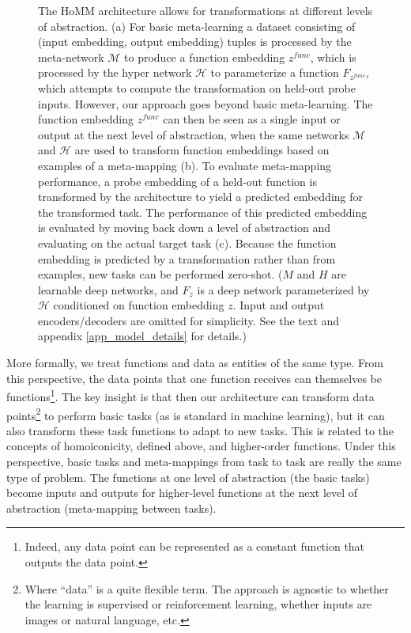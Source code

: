 \documentclass{article}
\begin{document}
\begin{figure}[t]
\caption{The HoMM architecture allows for transformations at different levels of abstraction. (a) For basic meta-learning a dataset consisting of (input embedding, output embedding) tuples is processed by the meta-network \(\mathcal{M}\) to produce a function embedding \(z^{func}\), which is processed by the hyper network \(\mathcal{H}\) to parameterize a function \(F_{z^{func}}\), which attempts to compute the transformation on held-out probe inputs. However, our approach goes beyond basic meta-learning. The function embedding \(z^{func}\) can then be seen as a single input or output at the next level of abstraction, when the same networks \(\mathcal{M}\) and \(\mathcal{H}\) are used to transform function embeddings based on examples of a meta-mapping (b). To evaluate meta-mapping performance, a probe embedding of a held-out function is transformed by the architecture to yield a predicted embedding for the transformed task. The performance of this predicted embedding is evaluated by moving back down a level of abstraction and evaluating on the actual target task (c). Because the function embedding is predicted by a transformation rather than from examples, new tasks can be performed zero-shot. (\(M\) and \(H\) are learnable deep networks, and $F_{z}$ is a deep network parameterized by $\mathcal{H}$ conditioned on function embedding \(z\). Input and output encoders/decoders are omitted for simplicity. See the text and appendix \ref{app_model_details} for details.)} \label{architecture_inference_fig}
\end{figure}
More formally, we treat functions and data as entities of the same type. From this perspective, the data points that one function receives can themselves be functions\footnote{Indeed, any data point can be represented as a constant function that outputs the data point.}. The key insight is that then our architecture can transform data points\footnote{Where ``data'' is a quite flexible term. The approach is agnostic to whether the learning is supervised or reinforcement learning, whether inputs are images or natural language, etc.} to perform basic tasks (as is standard in machine learning), but it can also transform these task functions to adapt to new tasks. This is related to the concepts of homoiconicity, defined above, and higher-order functions. Under this perspective, basic tasks and meta-mappings from task to task are really the same type of problem. The functions at one level of abstraction (the basic tasks) become inputs and outputs for higher-level functions at the next level of abstraction (meta-mapping between tasks). \par
\end{document}
